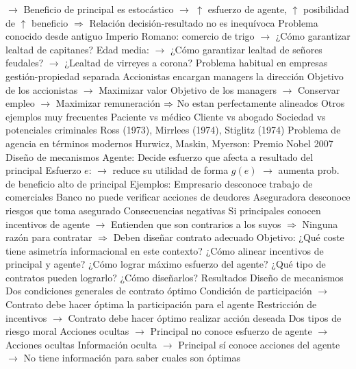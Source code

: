 \documentclass{nuevotema}
\begin{document}
\begin{esquemal}
				\4[] $\to$ Beneficio de principal es estocástico
				\4[] $\to$ $\uparrow$ esfuerzo de agente, $\uparrow$ posibilidad de $\uparrow$ beneficio
				\4[] $\Rightarrow$ Relación decisión-resultado no es inequívoca
				\4 Problema conocido desde antiguo
				\4[] Imperio Romano: comercio de trigo
				\4[] $\to$ ¿Cómo garantizar lealtad de capitanes?
				\4[] Edad media:
				\4[] $\to$ ¿Cómo garantizar lealtad de señores feudales?
				\4[] $\to$ ¿Lealtad de virreyes a corona?
				\4 Problema habitual en empresas gestión-propiedad separada
				\4[] Accionistas encargan managers la dirección
				\4[] Objetivo de los accionistas
				\4[] $\to$ Maximizar valor
				\4[] Objetivo de los managers
				\4[] $\to$ Conservar empleo
				\4[] $\to$ Maximizar remuneración
				\4[] $\Rightarrow$ No estan perfectamente alineados
				\4 Otros ejemplos muy frecuentes
				\4[] Paciente vs médico
				\4[] Cliente vs abogado
				\4[] Sociedad vs potenciales criminales
				\4 Ross (1973), Mirrlees (1974), Stiglitz (1974)
				\4[] Problema de agencia en términos modernos
				\4 Hurwicz, Maskin, Myerson: Premio Nobel 2007
				\4[] Diseño de mecanismos
				\4 Agente:
				\4[] Decide esfuerzo que afecta a resultado del principal
				\4[] Esfuerzo $e$:
				\4[] $\to$ reduce su utilidad de forma $g(e)$
				\4[] $\to$ aumenta prob. de beneficio alto de principal
				\4 Ejemplos:
				\4[] Empresario desconoce trabajo de comerciales
				\4[] Banco no puede verificar acciones de deudores
				\4[] Aseguradora desconoce riesgos que toma asegurado
				\4 Consecuencias negativas
				\4[] Si principales conocen incentivos de agente
				\4[] $\to$ Entienden que son contrarios a los suyos
				\4[] $\Rightarrow$ Ninguna razón para contratar
				\4[] $\Rightarrow$ Deben diseñar contrato adecuado
			\3 Objetivo:
				\4 ¿Qué coste tiene asimetría informacional en este contexto?
				\4 ¿Cómo alinear incentivos de principal y agente?
				\4 ¿Cómo lograr máximo esfuerzo del agente?
				\4 ¿Qué tipo de contratos pueden lograrlo?
				\4 ¿Cómo diseñarlos?
			\3 Resultados
				\4 Diseño de mecanismos
				\4 Dos condiciones generales de contrato óptimo
				\4[] Condición de participación
				\4[] $\to$ Contrato debe hacer óptima la participación para el agente
				\4[] Restricción de incentivos
				\4[] $\to$ Contrato debe hacer óptimo realizar acción deseada
				\4 Dos tipos de riesgo moral
				\4[] Acciones ocultas
				\4[] $\to$ Principal no conoce esfuerzo de agente
				\4[] $\to$ Acciones ocultas
				\4[] Información oculta
				\4[] $\to$ Principal sí conoce acciones del agente
				\4[] $\to$ No tiene información para saber cuales son óptimas

\end{esquemal}
\end{document}

